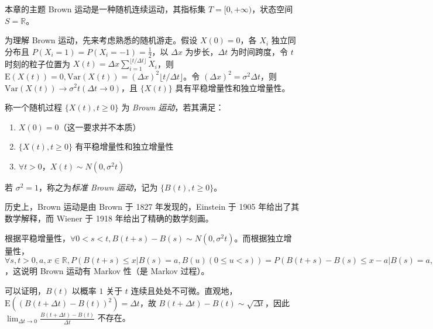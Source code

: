\documentclass[../main.tex]{subfiles}
\begin{document}
本章的主题 Brown 运动是一种随机连续运动，其指标集 $T=[0,+\infty)$，状态空间 $S=\mathbb R$。

为理解 Brown 运动，先来考虑熟悉的随机游走。假设 $X(0)=0$，各 $X_i$ 独立同分布且 $P(X_i=1)=P(X_i=-1)=\frac12$，以 $\Delta x$ 为步长，$\Delta t$ 为时间跨度，令 $t$ 时刻的粒子位置为 $X(t)=\Delta x\sum_{i=1}^{\lfloor t/\Delta t\rfloor}X_i$，则 $\mathrm E(X(t))=0,\mathrm{Var}(X(t))=(\Delta x)^2\lfloor t/\Delta t\rfloor$。令 $(\Delta x)^2=\sigma^2\Delta t$，则 $\mathrm{Var}(X(t))\rightarrow \sigma^2t(\Delta t\rightarrow0)$，且 $\{X(t)\}$ 具有平稳增量性和独立增量性。

\begin{definition}\label{def:8.1.1}
    称一个随机过程 $\{X(t),t\geq0\}$ 为 \emph{Brown 运动}，若其满足：
    \begin{enumerate}
        \item $X(0)=0$（这一要求并不本质）
        \item $\{X(t),t\geq0\}$ 有平稳增量性和独立增量性
        \item $\forall t>0$，$X(t)\sim N(0,\sigma^2t)$
    \end{enumerate}
    若 $\sigma^2=1$，称之为\emph{标准 Brown 运动}，记为 $\{B(t),t\geq0\}$。
\end{definition}

历史上，Brown 运动是由 Brown 于 1827 年发现的，Einstein 于 1905 年给出了其数学解释，而 Wiener 于 1918 年给出了精确的数学刻画。

根据平稳增量性，$\forall0<s<t,B(t+s)-B(s)\sim N(0,\sigma^2t)$。而根据独立增量性，$\forall s,t>0,a,x\in\mathbb R,P(B(t+s)\leq x|B(s)=a,B(u)(0\leq u<s))=P(B(t+s)-B(s)\leq x-a|B(s)=a,B(u)(0\leq u<s))=P(B(t+s)-B(s)\leq x-a)=P(B(t+s)\leq x|B(s)=a)$，这说明 Brown 运动有 Markov 性（是 Markov 过程）。

可以证明，$B(t)$ 以概率 $1$ 关于 $t$ 连续且处处不可微。直观地，$\mathrm E((B(t+\Delta t)-B(t))^2)=\Delta t$，故 $B(t+\Delta t)-B(t)\sim\sqrt{\Delta t}$，因此 $\lim_{\Delta t\rightarrow0}\frac{B(t+\Delta t)-B(t)}{\Delta t}$ 不存在。
\end{document}
